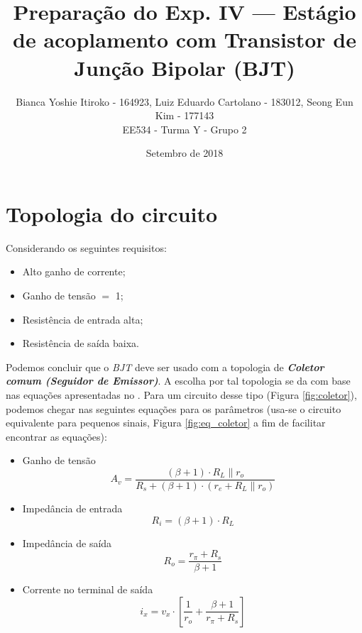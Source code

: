 \documentclass{article}
\begin{document}
    \title{Preparação do Exp. IV — Estágio de acoplamento com Transistor de Junção Bipolar (BJT)}
    \author{Bianca Yoshie Itiroko - 164923, Luiz Eduardo Cartolano - 183012, Seong Eun Kim - 177143 \\ EE534 - Turma Y - Grupo 2}
    \date{Setembro de 2018}

    \maketitle

    \section{Topologia do circuito} \label{sec:1}
        Considerando os seguintes requisitos:
        \begin{itemize}
            \item Alto ganho de corrente;
            \item Ganho de tensão $=$ 1;
            \item Resistência de entrada alta;
            \item Resistência de saída baixa.
        \end{itemize}
        Podemos concluir que o \emph{BJT} deve ser usado com a topologia de \textbf{\emph{Coletor comum (Seguidor de Emissor)}}. A escolha por tal topologia se da com base nas equações apresentadas no \cite{Sedra2004}. Para um circuito desse tipo (Figura \ref{fig:coletor}), podemos chegar nas seguintes equações para os parâmetros (usa-se o circuito equivalente para pequenos sinais, Figura \ref{fig:eq_coletor} a fim de facilitar encontrar as equações):
        \begin{itemize}
            \item Ganho de tensão
                \begin{equation}
                    A_v = \frac{(\beta + 1) \cdot R_L \parallel r_o}{R_s + (\beta + 1) \cdot (r_e + R_L \parallel r_o) }
                \end{equation}
            \item Impedância de entrada
                \begin{equation}
                    R_i = (\beta + 1) \cdot R_L
                \end{equation}
            \item Impedância de saída
                \begin{equation}
                    R_o = \frac{r_\pi + R_s}{\beta + 1}
                \end{equation}
            \item Corrente no terminal de saída
                \begin{equation}
                    i_x = v_x \cdot [\frac{1}{r_o} + \frac{\beta + 1}{r_\pi + R_s}]
                \end{equation}
        \end{itemize}
        
\end{document}
